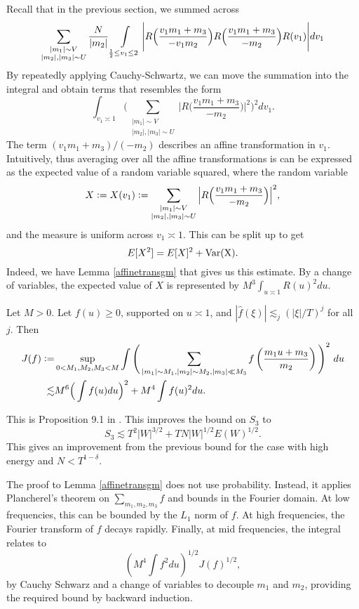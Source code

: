 Recall that in the previous section, we summed across 
\[
    \sum_{\substack{|m_1|\sim V\\ |m_2|, |m_3|\sim U}} \frac{N}{|m_2|} \int\displaylimits_{\substack{
        \frac{1}{2}\leq v_1\leq 2
    }} \Bigg|R\Big(\frac{v_1m_1+m_3}{-v_1m_2}\Big) R\Big(\frac{v_1m_1+m_3}{-m_2}\Big) R({v_1})\Bigg| dv_1
\]
By repeatedly applying Cauchy-Schwartz, we can move the summation into the integral and obtain terms that resembles the form \[
   \int_{v_1\asymp 1} \Bigg(\sum_{\substack{|m_1|\sim V\\ |m_2|, |m_3|\sim U}}  \Big| R\Big(\frac{v_1m_1+m_3}{-m_2}\Big)\Big|^2\Bigg)^2 dv_1.
\]
The term $(v_1m_1+m_3)/(-m_2)$ describes an affine transformation in $v_1$. Intuitively, thus averaging over all the affine transformations is can be expressed as the expected value of a random variable squared, where the random variable \[
X\mathrel{\mathop:}= X(v_1)\mathrel{\mathop:}= \sum_{\substack{|m_1|\sim V\\ |m_2|, |m_3|\sim U}}  \Big| R\Big(\frac{v_1m_1+m_3}{-m_2}\Big)\Big|^2,
\] and the measure is uniform across $v_1\asymp 1$. This can be split up to get \[
E[X^2] = E[X]^2 + \rm{Var}(X).
\] Indeed, we have Lemma \ref{affinetransgm} that gives us this estimate. 
By a change of variables, the expected value of $X$ is represented by $M^3 \int_{u\asymp 1} R(u)^2 du$.
\begin{lemma}\label{affinetransgm}
    Let $M>0$. Let $f(u)\geq 0$, supported on $u\asymp 1$, and $|\hat{f}(\xi)|\lesssim_j (|\xi|/T)^j$ for all $j$. Then \begin{align*}
        J(f)\mathrel{\mathop:}= &\sup_{0<M_1,M_2,M_3<M} \int\Bigg( \sum_{\substack{|m_1|\sim M_1,|m_2|\sim M_2 , |m_3|\ll M_3}} f\left(\frac{m_1 u+m_3}{m_2}\right)\Bigg)^2 \ du\\
        \lesssim&M^6\Big( \int f(u) du\Big)^2+M^4 \int f(u)^2 du.
    \end{align*}
\end{lemma}
This is Proposition 9.1 in \cite{GM2024}.
This improves the bound on $S_3$ to\[
S_3\lesssim T^2|W|^{3/2}+TN|W|^{1/2}E(W)^{1/2}.
\]
This gives an improvement from the previous bound for the case with high energy and $N<T^{1-\delta}$.
\begin{remark}
    The proof to Lemma \ref{affinetransgm} does not use probability. Instead, it applies Plancherel's theorem on $\sum_{m_1,m_2,m_3} f$ and bounds in the Fourier domain.
    At low frequencies, this can be bounded by the $L_1$ norm of $f$. At high frequencies, the Fourier transform of $f$ decays rapidly. Finally, at mid frequencies, the integral relates to \[
     (M^4\int f^2 du)^{1/2}J(f)^{1/2},
    \]
    by Cauchy Schwarz and a change of variables to decouple $m_1$ and $m_2$, providing the required bound by backward induction.
\end{remark}


